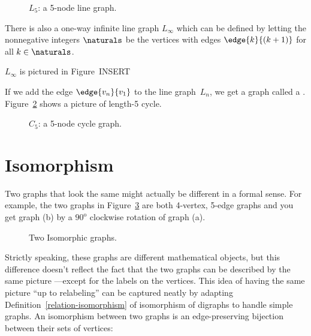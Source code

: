 \begin{figure}


\caption{$L_5$: a 5-node line graph.}

\label{fig:graph_L_5}

\end{figure}

There is also a one-way infinite line graph $L_{\infty}$ which can be
defined by letting the nonnegative integers $\naturals$ be the vertices
with edges $\edge{k}{(k+1)}$ for all $k \in \naturals$.
\begin{editingnotes}
$L_{\infty}$ is pictured in Figure~INSERT%
\end{editingnotes}

If we add the edge $\edge{v_n}{v_1}$ to the line graph~$L_n$, we get a
graph called a  .
Figure~\ref{fig:graph_C_5} shows a picture of length-5 cycle.

\begin{figure}


\caption{$C_5$: a 5-node cycle graph.}
\label{fig:graph_C_5}
\end{figure}

\section{Isomorphism}
Two graphs that look the same might actually be different in a formal
sense.  For example, the two graphs in Figure~\ref{fig:isomorphic-C4cross}
are both 4-vertex, 5-edge graphs and you get graph (b) by a
$90^{\text{o}}$ clockwise rotation of graph (a).
\begin{figure}

\qquad
{}

\caption{Two Isomorphic graphs.}
\label{fig:isomorphic-C4cross}
\end{figure}

Strictly speaking, these graphs are different mathematical objects,
but this difference doesn't reflect the fact that the two graphs can
be described by the same picture ---except for the labels on the
vertices.  This idea of having the same picture ``up to relabeling''
can be captured neatly by adapting
Definition~\ref{relation-isomorphism} of isomorphism of digraphs to
handle simple graphs.  An isomorphism between two graphs is an
edge-preserving bijection between their sets of vertices:

